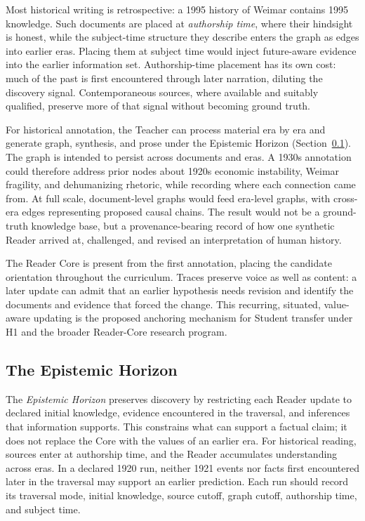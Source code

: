 \documentclass[11pt]{article}
\begin{document}
Most historical writing is retrospective: a 1995 history of Weimar contains
1995 knowledge. Such documents are placed at \emph{authorship time}, where their
hindsight is honest, while the subject-time structure they describe enters the
graph as edges into earlier eras. Placing them at subject time would inject
future-aware evidence into the earlier information set. Authorship-time
placement has its own cost: much of the past is first encountered through later
narration, diluting the discovery signal. Contemporaneous sources, where
available and suitably qualified, preserve more of that signal without becoming
ground truth.

For historical annotation, the Teacher can process material era by era and
generate graph, synthesis, and prose under the Epistemic Horizon
(Section~\ref{sec:epistemic-horizon}). The graph is intended to persist across
documents and eras. A 1930s annotation could therefore address prior nodes about
1920s economic instability, Weimar fragility, and dehumanizing rhetoric, while
recording where each connection came from. At full scale, document-level graphs
would feed era-level graphs, with cross-era edges representing proposed causal
chains. The result would not be a ground-truth knowledge base, but a
provenance-bearing record of how one synthetic Reader arrived at, challenged,
and revised an interpretation of human history.

The Reader Core is present from the first annotation, placing the candidate
orientation throughout the curriculum. Traces preserve voice as well as content: a later update can admit
that an earlier hypothesis needs revision and identify the documents and
evidence that forced the change. This recurring, situated, value-aware updating
is the proposed anchoring mechanism for Student transfer under H1 and the
broader Reader-Core research program.

\subsection{The Epistemic Horizon}\label{sec:epistemic-horizon}

The \emph{Epistemic Horizon} preserves discovery by restricting each Reader
update to declared initial knowledge, evidence encountered in the traversal,
and inferences that information supports. This constrains what can support a
factual claim; it does not replace the Core with the values of an earlier era.
For historical reading, sources enter at authorship time, and the Reader
accumulates understanding across eras. In a declared 1920 run, neither 1921
events nor facts first encountered later in the traversal may support an
earlier prediction. Each run should record its traversal mode, initial
knowledge, source cutoff, graph cutoff, authorship time, and subject time.
\end{document}
